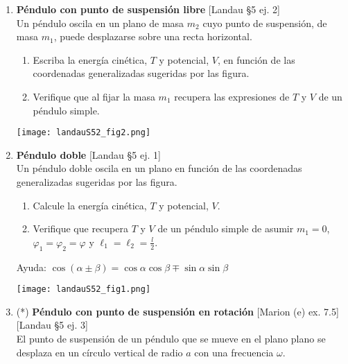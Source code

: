 \documentclass[11pt,spanish,a4paper]{article}
\begin{document}
\begin{enumerate}
\item \begin{minipage}[t][4cm]{0.7\textwidth}
\textbf{Péndulo con punto de suspensión libre} [Landau \S5 ej. 2]\\
Un péndulo oscila en un plano de masa \(m_2\) cuyo punto de suspensión, de masa \(m_1\), puede desplazarse sobre una recta horizontal.
\begin{enumerate}
	\item Escriba la energía cinética, \(T\) y potencial, \(V\), en función de las coordenadas generalizadas sugeridas por las figura.
	\item Verifique que al fijar la masa \(m_1\) recupera las expresiones de \(T\) y \(V\) de un péndulo simple.
\end{enumerate}
\end{minipage}
\begin{minipage}[c][1cm][t]{0.3\textwidth}
        \texttt{[image: landauS52\_fig2.png]}
\end{minipage}



\item \begin{minipage}[t][4cm]{0.7\textwidth}
\textbf{Péndulo doble} [Landau \S5 ej. 1]\\
Un péndulo doble oscila en un plano en función de las coordenadas generalizadas sugeridas por las figura.
\begin{enumerate}
	\item Calcule la energía cinética, \(T\) y potencial, \(V\).
	\item Verifique que recupera \(T\) y \(V\) de un péndulo simple de asumir \(m_1=0\), \(\varphi_1 = \varphi_2 = \varphi\) y \(\ell_1 = \ell_2 = \frac{l}{2}\).
\end{enumerate}
Ayuda: \( \cos(\alpha \pm \beta) = \cos{ \alpha} \cos{ \beta \mp \sin \alpha} \sin{ \beta } \)
\end{minipage}
\begin{minipage}[c][0.5cm][t]{0.3\textwidth}
	\texttt{[image: landauS52\_fig1.png]}
\end{minipage}



\item \begin{minipage}[t][7cm]{0.5\textwidth}
(*) \textbf{Péndulo con punto de suspensión en rotación} [Marion (e) ex. 7.5] [Landau \S5 ej. 3]\\
El punto de suspensión de un péndulo que se mueve en el plano plano se desplaza en un círculo vertical de radio \(a\) con una frecuencia \(\omega\).


\end{minipage}
\end{enumerate}
\end{document}
